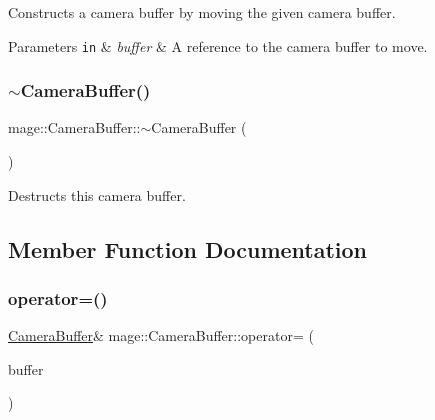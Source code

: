 Constructs a camera buffer by moving the given camera buffer.


\begin{DoxyParams}[1]{Parameters}
\mbox{\tt in}  & {\em buffer} & A reference to the camera buffer to move. \\
\hline
\end{DoxyParams}
\hypertarget{structmage_1_1_camera_buffer_a893ff21cfa017537ccd91dd816715701}{}\label{structmage_1_1_camera_buffer_a893ff21cfa017537ccd91dd816715701} 
\subsubsection{\texorpdfstring{$\sim$\+Camera\+Buffer()}{~CameraBuffer()}}
{\footnotesize\ttfamily mage\+::\+Camera\+Buffer\+::$\sim$\+Camera\+Buffer (\begin{DoxyParamCaption}{ }\end{DoxyParamCaption})\hspace{0.3cm}{\ttfamily [default]}}

Destructs this camera buffer. 

\subsection{Member Function Documentation}
\hypertarget{structmage_1_1_camera_buffer_a4c2f048e1c441ae147455722d9cd4af7}{}\label{structmage_1_1_camera_buffer_a4c2f048e1c441ae147455722d9cd4af7} 
\subsubsection{\texorpdfstring{operator=()}{operator=()}\hspace{0.1cm}{\footnotesize\ttfamily [1/2]}}
{\footnotesize\ttfamily \hyperlink{structmage_1_1_camera_buffer}{Camera\+Buffer}\& mage\+::\+Camera\+Buffer\+::operator= (\begin{DoxyParamCaption}\item[{const \hyperlink{structmage_1_1_camera_buffer}{Camera\+Buffer} \&}]{buffer }\end{DoxyParamCaption})\hspace{0.3cm}{\ttfamily [default]}}

